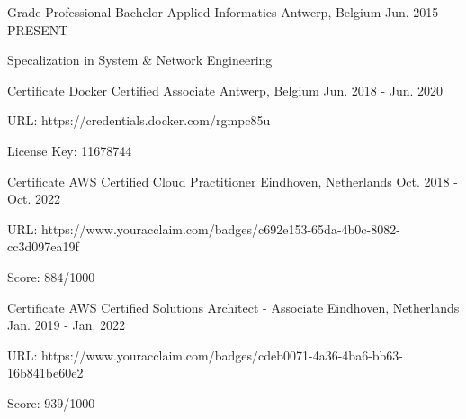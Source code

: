 

\begin{cventries}

  \cventry
    {Grade} %
    {Professional Bachelor Applied Informatics} %
    {Antwerp, Belgium} %
    {Jun. 2015 - PRESENT} %
    {
      \begin{cvitems} %
        \item {Specalization in System \& Network Engineering}
      \end{cvitems}
    }

  \cventry
    {Certificate} %
    {Docker Certified Associate} %
    {Antwerp, Belgium} %
    {Jun. 2018 - Jun. 2020} %
    {
      \begin{cvitems} %
        \item {URL: https://credentials.docker.com/rgmpc85u}
        \item {License Key: 11678744}
      \end{cvitems}
    }

  \cventry
    {Certificate} %
    {AWS Certified Cloud Practitioner} %
    {Eindhoven, Netherlands} %
    {Oct. 2018 - Oct. 2022} %
    {
      \begin{cvitems} %
        \item {URL: https://www.youracclaim.com/badges/c692e153-65da-4b0c-8082-cc3d097ea19f}
        \item {Score: 884/1000}
      \end{cvitems}
    }

  \cventry
    {Certificate} %
    {AWS Certified Solutions Architect - Associate} %
    {Eindhoven, Netherlands} %
    {Jan. 2019 - Jan. 2022} %
    {
      \begin{cvitems} %
        \item {URL: https://www.youracclaim.com/badges/cdeb0071-4a36-4ba6-bb63-16b841be60e2}
        \item {Score: 939/1000}
      \end{cvitems}
    }


\end{cventries}
